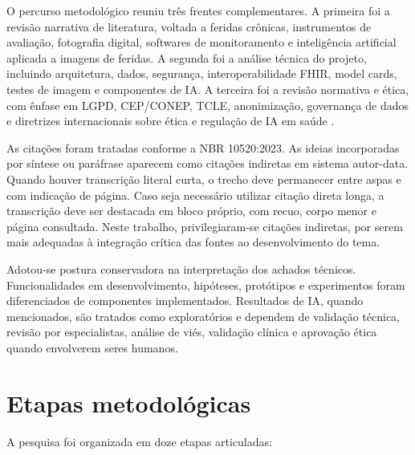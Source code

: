\documentclass[
    12pt,
    oneside,
    a4paper,
    chapter=TITLE,
    brazil,
    sumario=tradicional,
    hidelinks
]{abntex2}
\begin{document}
O percurso metodológico reuniu três frentes complementares. A primeira foi a revisão narrativa de literatura, voltada a feridas crônicas, instrumentos de avaliação, fotografia digital, softwares de monitoramento e inteligência artificial aplicada a imagens de feridas. A segunda foi a análise técnica do projeto, incluindo arquitetura, dados, segurança, interoperabilidade FHIR, model cards, testes de imagem e componentes de IA. A terceira foi a revisão normativa e ética, com ênfase em LGPD, CEP/CONEP, TCLE, anonimização, governança de dados e diretrizes internacionais sobre ética e regulação de IA em saúde \cite{who2021,who2023}.

As citações foram tratadas conforme a NBR 10520:2023. As ideias incorporadas por síntese ou paráfrase aparecem como citações indiretas em sistema autor-data. Quando houver transcrição literal curta, o trecho deve permanecer entre aspas e com indicação de página. Caso seja necessário utilizar citação direta longa, a transcrição deve ser destacada em bloco próprio, com recuo, corpo menor e página consultada. Neste trabalho, privilegiaram-se citações indiretas, por serem mais adequadas à integração crítica das fontes ao desenvolvimento do tema.

Adotou-se postura conservadora na interpretação dos achados técnicos. Funcionalidades em desenvolvimento, hipóteses, protótipos e experimentos foram diferenciados de componentes implementados. Resultados de IA, quando mencionados, são tratados como exploratórios e dependem de validação técnica, revisão por especialistas, análise de viés, validação clínica e aprovação ética quando envolverem seres humanos.

\section{Etapas metodológicas}

A pesquisa foi organizada em doze etapas articuladas:
\end{document}
